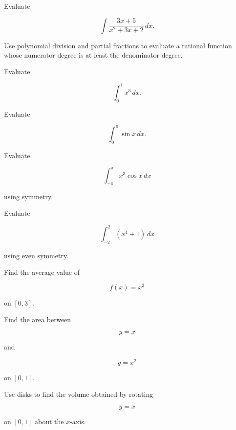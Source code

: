 \begin{exercise}[3]
Evaluate

\[
\int
\frac{
3x+5
}{
x^2+3x+2
}
\,dx.
\]
\end{exercise}

\begin{exercise}[3]
Use polynomial division and partial fractions to evaluate a rational function
whose numerator degree is at least the denominator degree.
\end{exercise}

\begin{exercise}[2]
Evaluate

\[
\int_0^1
x^3\,dx.
\]
\end{exercise}

\begin{exercise}[2]
Evaluate

\[
\int_0^\pi
\sin x\,dx.
\]
\end{exercise}

\begin{exercise}[2]
Evaluate

\[
\int_{-\pi}^{\pi}
x^3\cos x
\,dx
\]

using symmetry.
\end{exercise}

\begin{exercise}[2]
Evaluate

\[
\int_{-2}^{2}
(x^4+1)
\,dx
\]

using even symmetry.
\end{exercise}

\begin{exercise}[2]
Find the average value of

\[
f(x)=x^2
\]

on \([0,3]\).
\end{exercise}

\begin{exercise}[2]
Find the area between

\[
y=x
\]

and

\[
y=x^2
\]

on \([0,1]\).
\end{exercise}

\begin{exercise}[2]
Use disks to find the volume obtained by rotating

\[
y=x
\]

on \([0,1]\) about the \(x\)-axis.
\end{exercise}

